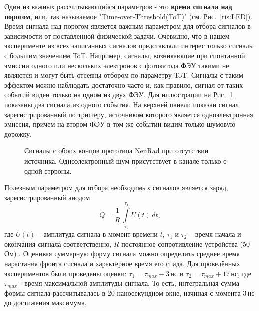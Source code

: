 Один из важных рассчитывающийся параметров - это \textbf{время сигнала над порогом}, или, так называемое "Time-over-Threshold(ToT)" (см. Рис.~\ref{ris:LED}). Время сигнала над порогом является важным параметром для отбора сигналов в зависимости от поставленной физической задачи.
Очевидно, что в нашем эксперименте из всех записанных сигналов представляли интерес только сигналы с большим значением ToT. Например, сигналы, возникающие при спонтанной эмиссии одного или нескольких электронов с фотокатода ФЭУ такими не являются и могут быть отсеяны отбором по параметру ToT. Сигналы с таким эффектом можно наблюдать достаточно часто и, как правило, сигнал от таких событий виден только на одном из двух ФЭУ.
Для иллюстрации на Рис.~\ref{ris:noise} показаны два сигнала из одного события. На верхней панели показан сигнал зарегистрированный по триггеру, источником которого является одноэлектронная эмиссия, причем на втором ФЭУ в том же событии видим только шумовую дорожку.

\begin{figure}[!h]
	\caption{Сигналы с обоих концов прототипа NeuRad при отсутствии источника. Одноэлектронный шум присутствует в канале только с одной стрроны.}
	\label{ris:noise}
\end{figure}


Полезным параметром для отбора необходимых сигналов является заряд, зарегистрированный анодом
\begin{equation}
Q = \frac{1}{R}\, \int\limits^{\tau_1}_{\tau_2} U(t)\, dt,
\label{charge}
\end{equation}
где $U(t)$ -- амплитуда сигнала в момент времени $t$, $\tau_1$ и $\tau_2$ -- время начала и окончания сигнала соответственно, $R$-постоянное сопротивление устройства (50\,Ом) \cite{vratislav}. Оценивая суммарную форму сигнала можно определить среднее время нарастания фронта сигнала и характерное время его спада. 
Для проведённых экспериментов были проведены оценки: $\tau_1 = \tau_{max} - 3\,$нс и $\tau_2 = \tau_{max} + 17\,$нс, где $\tau_{max}$ - время максимальной амплитуды сигнала. То есть, интегральная сумма формы сигнала рассчитывалась в 20 наносекундном окне, начиная с момента 3\,нс до достижения максимума.

